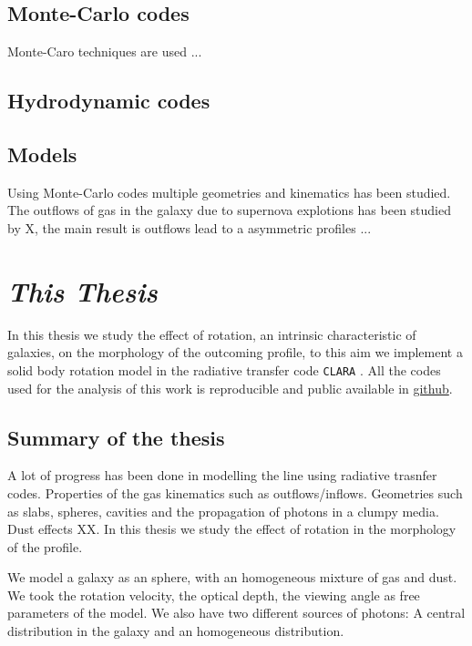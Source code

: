 \subsection{Monte-Carlo codes}

Monte-Caro techniques are used ...

\subsection{Hydrodynamic codes} 

\subsection{Models}

Using Monte-Carlo codes multiple geometries and kinematics has been 
studied. The outflows of gas in the galaxy due to supernova explotions
has been studied by X, the main result is outflows lead to a asymmetric
profiles ...

\section{\emph{This Thesis}}

In this thesis we study the effect of rotation, an intrinsic
 characteristic of galaxies, on the morphology
of the \lya outcoming profile, to this aim we implement a solid body
rotation model in the radiative transfer code \verb+CLARA+ \citep{CLARA}.
All the codes used for the analysis of this work is reproducible
and public available in \href{https://github.com/jngaravitoc/RotationLyAlpha}{github}.

\subsection{Summary of the thesis}

A lot of progress has been done in modelling the \ly line using radiative
trasnfer codes. Properties of the gas kinematics such as outflows/inflows. 
Geometries such as slabs, spheres, cavities and the propagation of \ly photons
in a clumpy media. Dust effects XX. In this thesis we study the effect 
of rotation in the morphology of the \ly profile.  

We model a galaxy as an sphere, with an homogeneous mixture of gas and dust. 
We took the rotation velocity, the optical depth, the viewing angle as free
parameters of the model. We also have two different sources of \ly photons:
A central distribution in the galaxy and an homogeneous distribution. 

